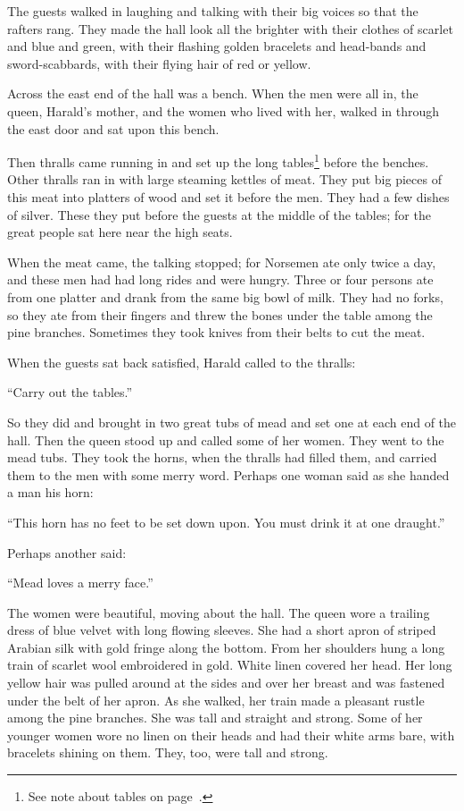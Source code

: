 The guests walked in laughing and talking with their big voices so that
the rafters rang. They made the hall look all the brighter with their
clothes of scarlet and blue and green, with their flashing golden
bracelets and head-bands and sword-scabbards, with their flying hair of
red or yellow.

Across the east end of the hall was a bench. When the men were all in,
the queen, Harald's mother, and the women who lived with her, walked in
through the east door and sat upon this bench.

Then thralls came running in and set up the long tables\footnote{See note
about tables on page~\pageref{tables}.} before the benches. Other thralls
ran in with large steaming kettles of meat. They put big pieces of this
meat into platters of wood and set it before the men. They had a few
dishes of silver. These they put before the guests at the middle of the
tables; for the great people sat here near the high seats.

When the meat came, the talking stopped; for Norsemen ate only twice a
day, and these men had had long rides and were hungry. Three or four
persons ate from one platter and drank from the same big bowl of milk.
They had no forks, so they ate from their fingers and threw the bones
under the table among the pine branches. Sometimes they took knives from
their belts to cut the meat.

When the guests sat back satisfied, Harald called to the thralls:

``Carry out the tables.''

So they did and brought in two great tubs of mead and set one at each
end of the hall. Then the queen stood up and called some of her women.
They went to the mead tubs. They took the horns, when the thralls had
filled them, and carried them to the men with some merry word. Perhaps
one woman said as she handed a man his horn:

``This horn has no feet to be set down upon. You must drink it at one
draught.''

Perhaps another said:

``Mead loves a merry face.''

The women were beautiful, moving about the hall. The queen wore a
trailing dress of blue velvet with long flowing sleeves. She had a short
apron of striped Arabian silk with gold fringe along the bottom. From
her shoulders hung a long train of scarlet wool embroidered in gold.
White linen covered her head. Her long yellow hair was pulled around at
the sides and over her breast and was fastened under the belt of her
apron. As she walked, her train made a pleasant rustle among the pine
branches. She was tall and straight and strong. Some of her younger
women wore no linen on their heads and had their white arms bare, with
bracelets shining on them. They, too, were tall and strong.


